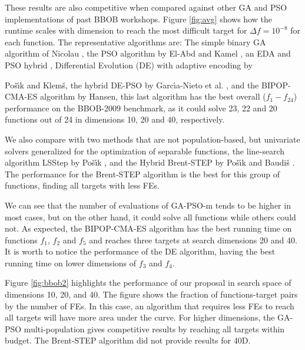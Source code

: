\documentclass[runningheads]{llncs}
\begin{document}
These results are also competitive when compared against other GA and PSO
implementations of past BBOB workshops. Figure \ref{fig:avg} shows
how the runtime scales with dimension to reach the most difficult target
for $\Delta f = 10^{-8}$ for each function.
The representative algorithms are:
The simple binary GA algorithm of Nicolau \cite{nicolau2009application},
the PSO algorithm by El-Abd and Kamel \cite{el2009black}, an EDA and PSO
hybrid \cite{el2009blackHybrid}, %
Differential Evolution (DE) with adaptive encoding \cite{povsik2012benchmarking}
by {Po{\v{s}}{\'\i}k and Klem{\v{s}},
the hybrid DE-PSO by Garc{\'\i}a-Nieto et
al. \cite{garcia2009noiseless}, %
and the BIPOP-CMA-ES algorithm \cite{hansen2009benchmarking} by Hansen, this last algorithm has the
best overall ($f_1-f_24$) performance on the BBOB-2009 benchmark,
as it  could solve 23, 22 and 20 functions out of 24 in dimensions 10, 20 and
40, respectively. %

We also compare with two methods that are not population-based, but univariate
solvers generalized for the optimization of separable functions, the
line-search algorithm LSStep by Po{\v{s}}{\'\i}k \cite{povsik2009bbob}, and the Hybrid Brent-STEP by
Po{\v{s}}{\'\i}k and Baudi{\v{s}} \cite{povsik2015dimension}. The performance for the Brent-STEP algorithm
is the best for this group of functions, finding all targets with less FEs.

We can see that the number of evaluations of {\sf GA-PSO-m} tends to be higher
in most cases, but on the other hand, it could solve all functions
while others could not. %
As expected, the BIPOP-CMA-ES algorithm has the best running time on functions
$f_1$, $f_2$ and $f_5$ and reaches three targets at search dimensions 20 and 40.
It is worth to notice the performance of the DE algorithm, having the best
running time on lower dimensions of  $f_3$ and $f_4$.

Figure \ref{fig:bbob2} highlights the performance of our proposal in search
space of dimensions 10, 20, and 40. The figure shows the fraction of
functions-target pairs by the number of FEs. In this case, an algorithm that
requires less FEs to reach all targets will have more area under the curve. For
higher dimensions, the GA-PSO multi-population gives competitive results by
reaching all targets within budget. The Brent-STEP algorithm did not provide
results for 40D.

}
\end{document}
